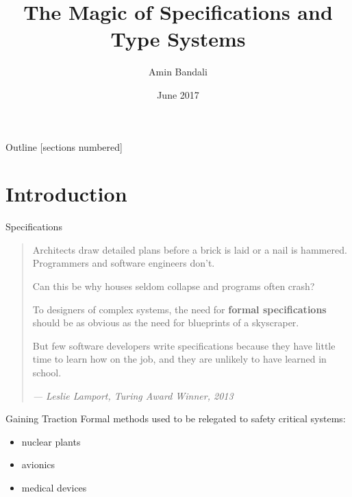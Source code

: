 \documentclass[10pt]{beamer}
\title{The Magic of Specifications and Type Systems}
\date{\footnotesize June 2017}
\author{\normalsize Amin Bandali}
\institute{
  Software Engineering Lab, EECS\\
  York University
}
\begin{document}
\maketitle

\begin{frame}{Outline}
  [sections numbered]
  \tableofcontents[hideallsubsections]
\end{frame}


\section{Introduction}

\begin{frame}[fragile]{Specifications}
  \begin{quote}
    \vspace{.4cm}
    \small
    {\normalfont Architects draw detailed plans before a brick
      is laid or a nail is hammered. Programmers and software
      engineers don't.}\vspace{.3cm}
    \pause

    Can this be why houses seldom collapse and programs often
    crash?\newline
    \pause

    To designers of complex systems, the need for \textbf{formal
      specifications} should be as obvious as the need for blueprints
    of a skyscraper.\newline
    \pause

    But few software developers write specifications because they
    have little time to learn how on the job, and they are unlikely to
    have learned in school.\newline
    \pause

    \hfill \textit{--- Leslie Lamport, Turing Award Winner, 2013}
  \end{quote}

\end{frame}

\begin{frame}[fragile]{Gaining Traction}
  Formal methods used to be relegated to safety critical systems:
  \begin{itemize}
    \item nuclear plants
    \item avionics
    \item medical devices
  \end{itemize}
\end{frame}
\end{document}
